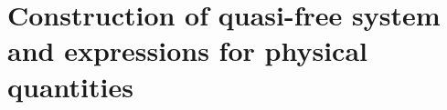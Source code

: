 \documentclass[10pt,t]{beamer}
\begin{document}



























\section{Construction of quasi-free system and expressions
  for physical quantities}
\end{document}
